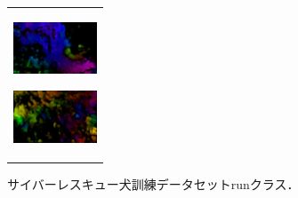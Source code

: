 \begin{enumerate}
\begin{end}
\begin{figure}[H]
\begin{tabular}{l}
\begin{minipage}{0.165\hsize}
        \begin{center}
          \includegraphics[clip, width=2.5cm]{./Figures/optic_run4.eps}
          \hspace{0.1cm} { }
        \end{center}
      \end{minipage}
      \begin{minipage}{0.165\hsize}
        \begin{center}
          \includegraphics[clip, width=2.5cm]{./Figures/optic_run5.eps}
          \hspace{2.2cm} { }
        \end{center}
      \end{minipage}
    \end{tabular}
    \caption{サイバーレスキュー犬訓練データセットrunクラス．}
    \label{run}
\end{figure}

\begin{figure}[H]
    \begin{tabular}{l}


\\ %


\end{tabular}
\end{figure}
\end{end}
\end{enumerate}
